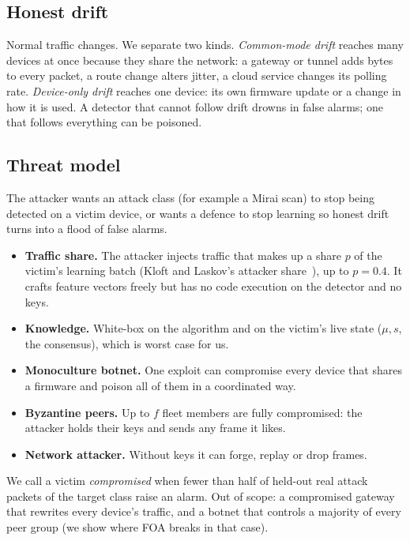 \subsection{Honest drift}
Normal traffic changes. We separate two kinds. \emph{Common-mode drift} reaches many devices at once
because they share the network: a gateway or tunnel adds bytes to every packet, a route change alters
jitter, a cloud service changes its polling rate. \emph{Device-only drift} reaches one device: its own
firmware update or a change in how it is used. A detector that cannot follow drift drowns in false
alarms; one that follows everything can be poisoned.

\subsection{Threat model}\label{sec:threat}
The attacker wants an attack class (for example a Mirai scan) to stop being detected on a victim
device, or wants a defence to stop learning so honest drift turns into a flood of false alarms.
\begin{itemize}
\item \textbf{Traffic share.} The attacker injects traffic that makes up a share $p$ of the victim's
  learning batch (Kloft and Laskov's attacker share~\cite{kloft}), up to $p=0.4$. It crafts feature
  vectors freely but has no code execution on the detector and no keys.
\item \textbf{Knowledge.} White-box on the algorithm and on the victim's live state ($\mu, s$, the
  consensus), which is worst case for us.
\item \textbf{Monoculture botnet.} One exploit can compromise every device that shares a firmware and
  poison all of them in a coordinated way.
\item \textbf{Byzantine peers.} Up to $f$ fleet members are fully compromised: the attacker holds their
  keys and sends any frame it likes.
\item \textbf{Network attacker.} Without keys it can forge, replay or drop frames.
\end{itemize}
We call a victim \emph{compromised} when fewer than half of held-out real attack packets of the target
class raise an alarm. Out of scope: a compromised gateway that rewrites every device's traffic, and a
botnet that controls a majority of every peer group (we show where FOA breaks in that case).
